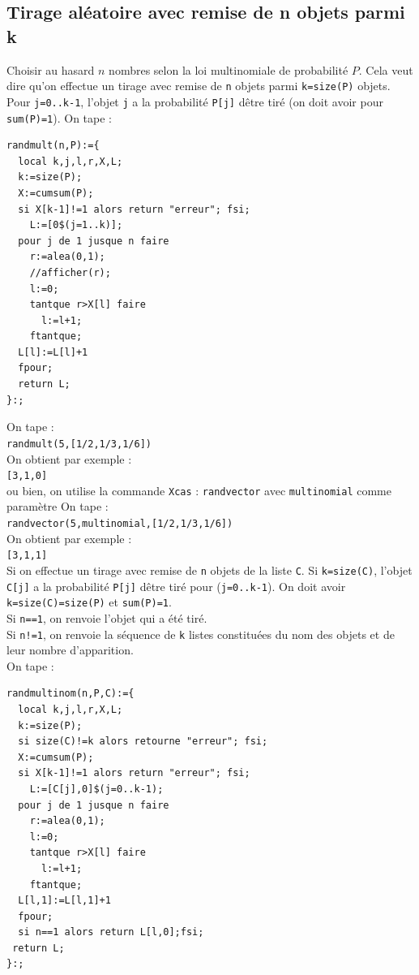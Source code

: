 \documentclass[a4paper,11pt]{book}
\begin{document}
\subsection{Tirage al\'eatoire avec remise de n objets parmi k}
Choisir au hasard $n$ nombres selon la loi multinomiale de probabilit\'e $P$.
Cela veut dire qu'on effectue un tirage avec remise de {\tt n} objets 
parmi {\tt k=size(P)} objets. Pour {\tt j=0..k-1}, l'objet {\tt j} a la 
probabilit\'e {\tt P[j]} d\^etre tir\'e (on doit avoir pour {\tt sum(P)=1}).
On tape :
\begin{verbatim}
randmult(n,P):={
  local k,j,l,r,X,L;
  k:=size(P);
  X:=cumsum(P);
  si X[k-1]!=1 alors return "erreur"; fsi;
    L:=[0$(j=1..k)];
  pour j de 1 jusque n faire 
    r:=alea(0,1);
    //afficher(r);
    l:=0;
    tantque r>X[l] faire
      l:=l+1;
    ftantque;
  L[l]:=L[l]+1  
  fpour;
  return L;
}:;
\end{verbatim}
On tape :\\
{\tt randmult(5,[1/2,1/3,1/6])}\\
On obtient par exemple :\\
{\tt [3,1,0]}\\
ou bien, on utilise la commande {\tt Xcas} : {\tt randvector} avec 
{\tt multinomial} comme param\`etre
On tape :\\
{\tt randvector(5,multinomial,[1/2,1/3,1/6])}\\
On obtient par exemple :\\
{\tt [3,1,1]}\\
Si on effectue un tirage avec remise de {\tt n} objets de la liste 
{\tt C}. Si {\tt k=size(C)}, l'objet {\tt C[j]} a la probabilit\'e {\tt P[j]} 
d\^etre tir\'e pour ({\tt j=0..k-1}). On doit avoir 
{\tt k=size(C)=size(P)} et {\tt sum(P)=1}.\\
Si {\tt n==1}, on renvoie l'objet qui a \'et\'e tir\'e.\\
Si {\tt n!=1}, on renvoie la s\'equence de {\tt k} listes constitu\'ees du nom
 des objets et de leur nombre d'apparition.\\
On tape :\\
\begin{verbatim}
randmultinom(n,P,C):={
  local k,j,l,r,X,L;
  k:=size(P);
  si size(C)!=k alors retourne "erreur"; fsi;
  X:=cumsum(P);
  si X[k-1]!=1 alors return "erreur"; fsi;  
    L:=[C[j],0]$(j=0..k-1);
  pour j de 1 jusque n faire 
    r:=alea(0,1);
    l:=0;
    tantque r>X[l] faire
      l:=l+1;
    ftantque;
  L[l,1]:=L[l,1]+1  
  fpour;
  si n==1 alors return L[l,0];fsi;
 return L; 
}:;
\end{verbatim}
\end{document}

